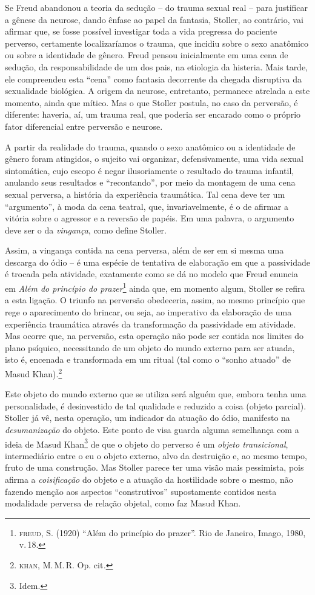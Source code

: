 Se Freud abandonou a teoria da sedução -- do trauma sexual real -- para
justificar a gênese da neurose, dando ênfase ao papel da fantasia,
Stoller, ao contrário, vai afirmar que, se fosse possível investigar
toda a vida pregressa do paciente perverso, certamente localizaríamos o
trauma, que incidiu sobre o sexo anatômico ou sobre a identidade de
gênero. Freud pensou inicialmente em uma cena de sedução, da
responsabilidade de um dos pais, na etiologia da histeria. Mais tarde,
ele compreendeu esta ``cena'' como fantasia decorrente da chegada
disruptiva da sexualidade biológica. A origem da neurose, entretanto,
permanece atrelada a este momento, ainda que mítico. Mas o que Stoller
postula, no caso da perversão, é diferente: haveria, aí, um trauma real,
que poderia ser encarado como o próprio fator diferencial entre
perversão e neurose.

A partir da realidade do trauma, quando o sexo anatômico ou a identidade
de gênero foram atingidos, o sujeito vai organizar, defensivamente, uma
vida sexual sintomática, cujo escopo é negar ilusoriamente o resultado
do trauma infantil, anulando seus resultados e ``recontando'', por meio
da montagem de uma cena sexual perversa, a história da experiência
traumática. Tal cena deve ter um ``argumento'', à moda da cena teatral,
que, invariavelmente, é o de afirmar a vitória sobre o agressor e a
reversão de papéis. Em uma palavra, o argumento deve ser o da
\emph{vingança}, como define Stoller.

Assim, a vingança contida na cena perversa, além de ser em si mesma uma
descarga do ódio -- é uma espécie de tentativa de elaboração em que a
passividade é trocada pela atividade, exatamente como se dá no modelo
que Freud enuncia em \emph{Além do princípio do prazer}\footnote{\textsc{freud},
 S. (1920) ``Além do princípio do prazer''.  Rio de
  Janeiro, Imago, 1980, v.\,18.} ainda que, em momento algum, Stoller se
refira a esta ligação. O triunfo na perversão obedeceria, assim, ao
mesmo princípio que rege o aparecimento do brincar, ou seja, ao
imperativo da elaboração de uma experiência traumática através da
transformação da passividade em atividade. Mas ocorre que, na perversão,
esta operação não pode ser contida nos limites do plano psíquico,
necessitando de um objeto do mundo externo para ser atuada, isto é,
encenada e transformada em um ritual (tal como o ``sonho atuado'' de
Masud Khan).\footnote{\textsc{khan}, M.\,M.\,R. Op. cit\emph{.}}

Este objeto do mundo externo que se utiliza será alguém que, embora
tenha uma personalidade, é desinvestido de tal qualidade e reduzido a
coisa (objeto parcial). Stoller já vê, nesta operação, um indicador da
atuação do ódio, manifesto na \emph{desumanização} do objeto. Este ponto
de visa guarda alguma semelhança com a ideia de Masud Khan\footnote{Idem.}
de que o objeto do perverso é um \emph{objeto transicional},
intermediário entre o eu o objeto externo, alvo da destruição e, ao
mesmo tempo, fruto de uma construção. Mas Stoller parece ter uma visão
mais pessimista, pois afirma a \emph{coisificação} do objeto e a atuação
da hostilidade sobre o mesmo, não fazendo menção aos aspectos
``construtivos'' supostamente contidos nesta modalidade perversa de
relação objetal, como faz Masud Khan.

